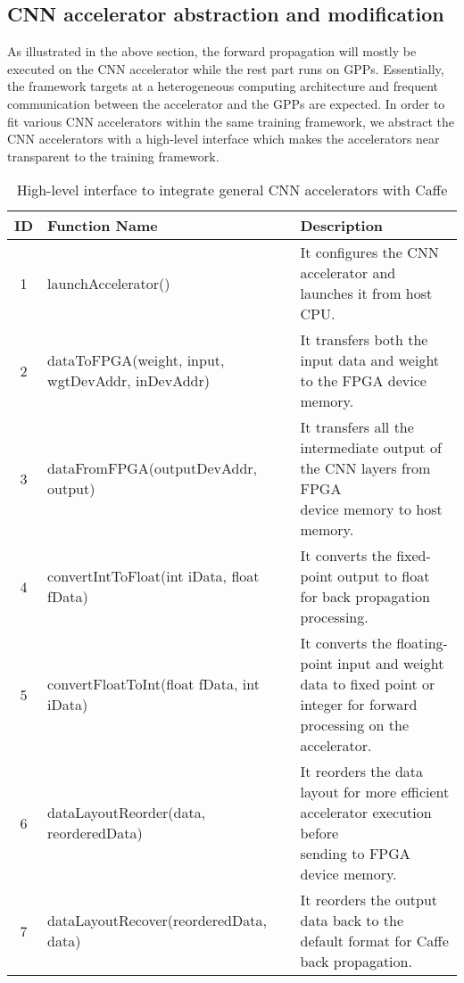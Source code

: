 \subsection{CNN accelerator abstraction and modification}
As illustrated in the above section, the forward propagation will 
mostly be executed on the CNN accelerator while 
the rest part runs on GPPs. Essentially, the framework targets at a 
heterogeneous computing architecture and frequent 
communication between the accelerator and the GPPs are expected. 
In order to fit various CNN accelerators within the same training framework,
we abstract the CNN accelerators with a high-level interface
which makes the accelerators near transparent to the training framework.
\begin{table*}
        \centering
        \vspace{-0.3em}
        \caption{High-level interface to integrate general CNN accelerators with Caffe}
        \label{tab:api}
        \vspace{-0.3em}
        \begin{tabular}{c|l|l}
                \toprule
                ID & Function Name & Description  \\
                \midrule
                1 & launchAccelerator() & It configures the CNN accelerator and launches it from host CPU. \\
		\midrule
                2 & dataToFPGA(weight, input, wgtDevAddr, inDevAddr) & It transfers both the input data and weight to the FPGA device memory. \\
		\midrule
		3 & dataFromFPGA(outputDevAddr, output) & \shortstack[l]{It transfers all the intermediate output of the CNN layers from FPGA \\device memory to host memory.} \\
		\midrule
		4 & convertIntToFloat(int iData, float fData) & It converts the fixed-point output to float for back propagation processing. \\
		\midrule
		5 & convertFloatToInt(float fData,  int iData) & \shortstack[l]{It converts the floating-point input and weight data to fixed point or \\integer for forward processing on the accelerator.} \\
		\midrule
		6 & dataLayoutReorder(data, reorderedData) & \shortstack[l]{It reorders the data layout for more efficient accelerator execution before \\sending to FPGA device memory.} \\
		\midrule
		7 & dataLayoutRecover(reorderedData, data) & It reorders the output data back to the default format for Caffe back propagation. \\
                \bottomrule
        \end{tabular}
        \vspace{-1em}
\end{table*}

